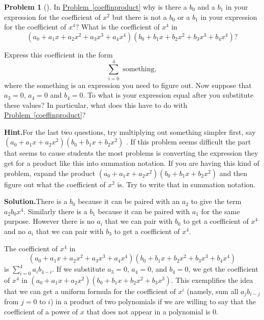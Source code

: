 \documentclass[10pt,]{book}
\theoremstyle{plain}
\theoremstyle{definition}
\newtheorem{activity}[project]{Problem}
\theoremstyle{definition}
\numberwithin{equation}{chapter}
\begin{document}
\begin{activity}[]\label{coeffinproduct1}
In \hyperref[coeffinproduct]{Problem~\ref{coeffinproduct}} why is there a \(b_0\) and a \(b_1\) in your expression for the coefficient of \(x^2\) but there is not a \(b_0\) or a \(b_1\) in your expression for the coefficient of \(x^4\)? What is the coefficient of \(x^4\) in%
\begin{equation*}
(a_0+a_1x+a_2x^2+a_3x^3+a_4x^4)(b_0+b_1x+b_2x^2
+b_3x^3+b_4x^4)?
\end{equation*}
%
\par
Express this coefficient in the form%
\begin{equation*}
\sum_{i=0}^4 \mbox{ something} ,
\end{equation*}
where the something is an expression you need to figure out. Now suppose that \(a_3=0\), \(a_4=0\) and \(b_4=0\). To what is your expression equal after you substitute these values? In particular, what does this have to do with \hyperref[coeffinproduct]{Problem~\ref{coeffinproduct}}?%
\par\medskip\noindent%
\textbf{Hint.}\quad For the last two questions, try multiplying out something simpler first, say \((a_0 + a_1 x + a_2 x^2 )(b_0 + b_1 x + b_2 x^2 )\) . If this problem seems difficult the part that seems to cause students the most problems is converting the expression they get for a product like this into summation notation. If you are having this kind of problem, expand the product \((a_0 + a_1 x + a_2 x^2 )(b_0 + b_1 x + b_2 x^2 )\) and then figure out what the coefficient of \(x^2\) is. Try to write that in summation notation.%
\par\medskip\noindent%
\textbf{Solution.}\quad There is a \(b_0\) because it can be paired with an \(a_2\) to give the term \(a_2b_0x^4\). Similarly there is a \(b_1\) because it can be paired with \(a_1\) for the same purpose. However there is no \(a_i\) that we can pair with \(b_0\) to get a coefficient of \(x^4\) and no \(a_i\) that we can pair with \(b_3\) to get a coefficient of \(x^4\).%
\par
The coefficient of \(x^4\) in%
\begin{equation*}
(a_0+a_1x+a_2x^2+a_3x^3+a_4x^4)(b_0+b_1x+b_2x^2
+b_3x^3+b_4x^4)
\end{equation*}
is \(\sum_{i=0}^4 a_ib_{4-i}\). If we substitute \(a_3=0\), \(a_4=0\), and \(b_4 =0\), we get the coefficient of \(x^4\) in \((a_0
+a_1x+a_2x^2)(b_0+b_1x+b_2x^2+b_3x^3)\). This exemplifies the idea that we can get a uniform formula for the coefficient of \(x^i\) (namely, sum all \(a_jb_{i-j}\) from \(j=0\) to \(i\)) in a product of two polynomials if we are willing to say that the coefficient of a power of \(x\) that does not appear in a polynomial is 0.%
\end{activity}
\end{document}
